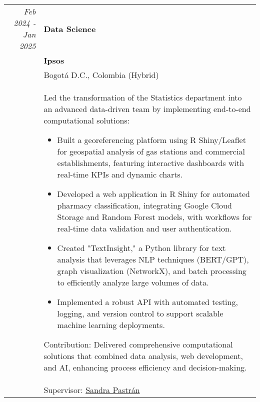 \documentclass[a4paper,10pt]{article} %
\begin{document}
\begin{tabular}{r|p{11cm}}
    
    
\\
\emph{Feb 2024 - Jan 2025} & \textbf{Data Science} \\
& \textbf{Ipsos} \\
& Bogotá D.C., Colombia (Hybrid) \\
& \footnotesize{
Led the transformation of the Statistics department into an advanced data-driven team by implementing end-to-end computational solutions:
\begin{itemize}
    \item Built a georeferencing platform using R Shiny/Leaflet for geospatial analysis of gas stations and commercial establishments, featuring interactive dashboards with real-time KPIs and dynamic charts.
    \item Developed a web application in R Shiny for automated pharmacy classification, integrating Google Cloud Storage and Random Forest models, with workflows for real-time data validation and user authentication.
    \item Created "TextInsight," a Python library for text analysis that leverages NLP techniques (BERT/GPT), graph visualization (NetworkX), and batch processing to efficiently analyze large volumes of data.
    \item Implemented a robust API with automated testing, logging, and version control to support scalable machine learning deployments.
\end{itemize}
Contribution: Delivered comprehensive computational solutions that combined data analysis, web development, and AI, enhancing process efficiency and decision-making.
} \\
& Supervisor: \href{mailto:sandra.pastran@ipsos.com}{Sandra Pastrán} \\
\end{tabular}
\end{document}
